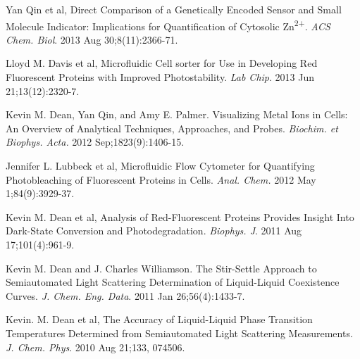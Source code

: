 \begin{etaremune}
\item Yan Qin et al, Direct Comparison of a Genetically Encoded Sensor and Small Molecule Indicator: Implications for Quantification of Cytosolic Zn\textsuperscript{2+}. {\it ACS Chem. Biol}. 2013 Aug 30;8(11):2366-71.

\item Lloyd M. Davis et al, Microfluidic Cell sorter for Use in Developing Red Fluorescent Proteins with Improved Photostability. {\it Lab Chip}. 2013 Jun 21;13(12):2320-7.

\item Kevin M. Dean, Yan Qin, and Amy E. Palmer.  Visualizing Metal Ions in Cells:  An Overview of Analytical Techniques, Approaches, and Probes. {\it Biochim. et Biophys. Acta.}  2012  Sep;1823(9):1406-15.

\item Jennifer L. Lubbeck et al, Microfluidic Flow Cytometer for Quantifying Photobleaching of Fluorescent Proteins in Cells. {\it Anal. Chem.} 2012 May 1;84(9):3929-37.

\item Kevin M. Dean et al, Analysis of Red-Fluorescent Proteins Provides Insight Into Dark-State Conversion and Photodegradation.  {\it Biophys. J}. 2011 Aug 17;101(4):961-9.

\item Kevin M. Dean and J. Charles Williamson. The Stir-Settle Approach to Semiautomated Light Scattering Determination of Liquid-Liquid Coexistence Curves.  {\it J. Chem. Eng. Data}.  2011 Jan 26;56(4):1433-7. 

\item Kevin. M. Dean et al, The Accuracy of Liquid-Liquid Phase Transition Temperatures Determined from Semiautomated Light Scattering Measurements.  {\it J. Chem. Phys}. 2010 Aug 21;133, 074506.

\end{etaremune}